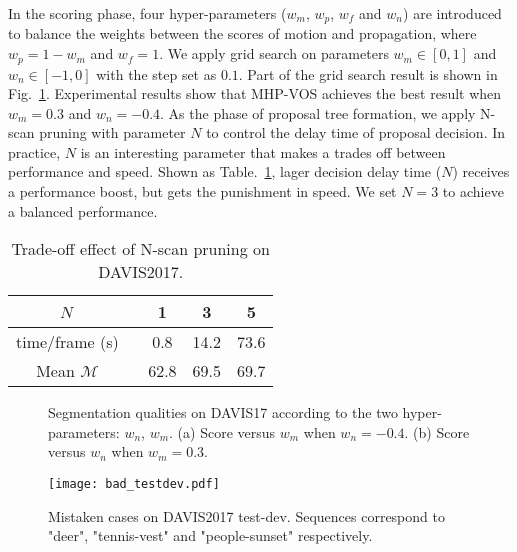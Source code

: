 \documentclass[10pt,twocolumn,letterpaper]{article}
\begin{document}
In the scoring phase, four hyper-parameters ($w_m$, $w_p$, $w_f$ and $w_n$) are introduced to balance the weights between the scores of motion and propagation, where ${w_p}=1-{w_m}$ and ${w_f}=1$. We apply grid search on parameters ${{w_m} \in [0,1]}$ and ${w_n} \in [ - 1,0]$ with the step set as $0.1$. Part of the grid search result is shown in Fig.~\ref{Fig.hyper_parameters}. Experimental results show that MHP-VOS achieves the best result when ${w_m}=0.3$ and ${w_n}=-0.4$. As the phase of proposal tree formation, we apply N-scan pruning with parameter $N$ to control the delay time of proposal decision. In practice, $N$ is an interesting parameter that makes a trades off between performance and speed. Shown as Table.~\ref{tab:n_purning}, lager decision delay time ($N$) receives a performance boost, but gets the punishment in speed. We set $N=3$ to achieve a balanced performance.

\begin{table}[H]
\vspace{-5pt}
\small
\centering
\begin{tabular}{c|ccc}
\hline
$N$ \ & 1 & 3 & 5 \\ \hline 
time/frame (s) \ & 0.8 & 14.2  & 73.6 \\
Mean $\mathcal{M}$ \ & 62.8 & 69.5 & 69.7 \\ \hline 
\end{tabular}
\vspace{3pt}
\caption{Trade-off effect of N-scan pruning on DAVIS2017.}
\label{tab:n_purning}
\vspace{-10pt}
\end{table}




\begin{figure}[t]
\vspace{-14pt}
\centering 
{}
\vspace{-6pt}
\caption{Segmentation qualities on DAVIS17 according to the two hyper-parameters: ${w_n}$, ${w_m}$. (a) Score versus ${w_m}$ when ${w_n}=-0.4$. (b) Score versus ${w_n}$ when ${w_m}=0.3$.}
\vspace{-14pt}
\label{Fig.hyper_parameters}
\end{figure}

\begin{figure}[b]
\vspace{-10pt}
\centering
\texttt{[image: bad\_testdev.pdf]}
\vspace{-12pt}
\caption{Mistaken cases on  DAVIS2017 test-dev. Sequences correspond to "deer", "tennis-vest" and "people-sunset" respectively.} 
\label{fig:bad_testdev}
\vspace{-10pt}
\end{figure}
\end{document}
